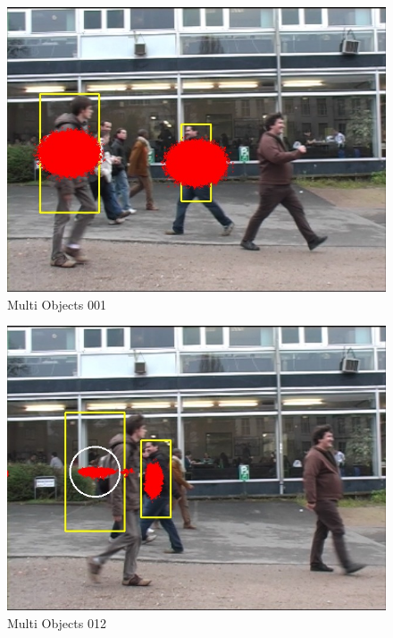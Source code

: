 \documentclass[10pt, conference, compsocconf]{IEEEtran}
\begin{document}
\begin{figure}[H]
	\centering
	\includegraphics[scale = 0.30]{image/p4/000001.jpg}
	\caption{Multi Objects 001}
	\label{fig:multi001}
\end{figure}

\begin{figure}[H]
	\centering
	\includegraphics[scale = 0.30]{image/p4/000012.jpg}
	\caption{Multi Objects 012}
	\label{fig:multi012}
\end{figure}
\end{document}
